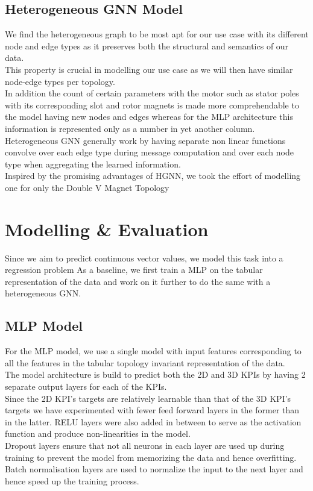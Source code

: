 \documentclass{report} %
\begin{document}
\section{Heterogeneous \ac{GNN} Model}\label{sec:Heterogeneous GNN Model}

We find the heterogeneous graph to be most apt for our use case with its different node and edge types as it preserves both the structural and semantics of our data. \\
This property is crucial in modelling our use case as we will then have similar node-edge types per topology. \\
In addition the count of certain parameters with the motor such as stator poles with its corresponding slot and rotor magnets is made more comprehendable to the model having new nodes and edges whereas for the \ac{MLP} architecture this information is represented only as a number in yet another column. \\
Heterogeneous \ac{GNN} generally work by having separate non linear functions convolve over each edge type during message computation and over each node type when aggregating the learned information. \\

Inspired by the promising advantages of HGNN, we took the effort of modelling one for only the Double V Magnet Topology

\newpage 
\chapter{Modelling \& Evaluation}

Since we aim to predict continuous vector values, we model this task into a regression problem
As a baseline, we first train a \ac{MLP} on the tabular representation of the data and work on it further to do the same with a heterogeneous \ac{GNN}.

\section{\ac{MLP} Model}\label{sec:MLP Model}

For the \ac{MLP} model, we use a single model with input features corresponding to all the features in the tabular topology invariant representation of the data.\\
The model architecture is build to predict both the \ac{2D} and \ac{3D} \ac{KPI}s by having 2 separate output layers for each of the \ac{KPI}s. \\
Since the \ac{2D} \ac{KPI}'s targets are relatively learnable than that of the \ac{3D} \ac{KPI}'s targets we have experimented with fewer feed forward layers in the former than in the latter.
RELU layers were also added in between to serve as the activation function and produce non-linearities in the model. \\
Dropout layers ensure that not all neurons in each layer are used up during training to prevent the model from memorizing the data and hence overfitting.
Batch normalisation layers are used to normalize the input to the next layer and hence speed up the training process.\\
\end{document}
